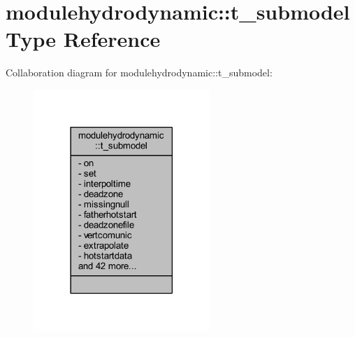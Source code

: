 \hypertarget{structmodulehydrodynamic_1_1t__submodel}{}\section{modulehydrodynamic\+:\+:t\+\_\+submodel Type Reference}
\label{structmodulehydrodynamic_1_1t__submodel}


Collaboration diagram for modulehydrodynamic\+:\+:t\+\_\+submodel\+:\nopagebreak
\begin{figure}[H]
\begin{center}
\leavevmode
\includegraphics[width=189pt]{structmodulehydrodynamic_1_1t__submodel__coll__graph}
\end{center}
\end{figure}

